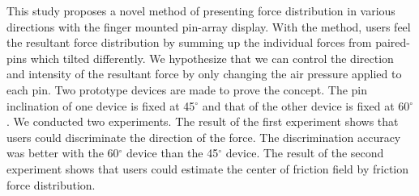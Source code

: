 This study proposes a novel method of presenting force distribution in various directions with the finger mounted pin-array display.
With the method, users feel the resultant force distribution by summing up the individual forces from paired-pins which tilted differently.
We hypothesize that we can control the direction and intensity of the resultant force by only changing the air pressure applied to each pin.
Two prototype devices are made to prove the concept.
The pin inclination of one device is fixed at 45$^{\circ}$ and that of the other device is fixed at 60$^{\circ}$.
We conducted two experiments.
The result of the first experiment shows that users could discriminate the direction of the force.
The discrimination accuracy was better with the 60$^{\circ}$ device than the 45$^{\circ}$ device.
The result of the second experiment shows that users could estimate the center of friction field by friction force distribution.
